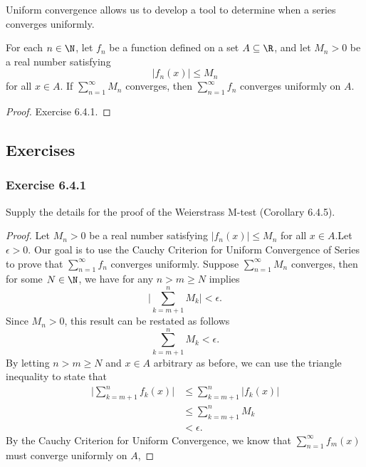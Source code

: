 Uniform convergence allows us to develop a tool to determine when a series converges uniformly.

\begin{tcolorbox}
    \begin{cor}
    For each \( n \in \N  \), let \( f_n  \) be a function defined on a set \( A \subseteq \R  \), and let \( M_n > 0  \) be a real number satisfying
    \[  | f_n(x)  | \leq M_n \] for all \( x \in A  \). If \( \sum_{ n=1 }^{ \infty  } M_n  \) converges, then \( \sum_{ n=1 }^{ \infty  } f_n  \) converges uniformly on \( A  \).
    \end{cor}
\end{tcolorbox}

\begin{proof}
Exercise 6.4.1.
\end{proof}

\subsection{Exercises}

\subsubsection{Exercise 6.4.1} Supply the details for the proof of the Weierstrass M-test (Corollary 6.4.5).

\begin{proof}
Let \( M_n > 0  \) be a real number satisfying \( | f_n(x)  | \leq M_n  \) for all \( x \in A  \).Let \( \epsilon > 0 \). Our goal is to use the Cauchy Criterion for Uniform Convergence of Series to prove that \( \sum_{ n=1 }^{ \infty  } f_n  \) converges uniformly. Suppose \( \sum_{ n=1 }^{ \infty  } M_n  \) converges, then for some \( N \in \N  \), we have for any \( n > m \geq N  \) implies 
\[ \Big| \sum_{ k=m+1 }^{ n } M_k \Big| < \epsilon.   \]
Since \( M_n > 0  \), this result can be restated as follows
\[  \sum_{ k=m+1 }^{ n } M_k < \epsilon. \]
By letting \( n > m \geq N  \) and \( x \in A  \) arbitrary as before, we can use the triangle inequality to state that 
\begin{align*}
    \Big| \sum_{ k=m+1 }^{ n } f_k(x)  \Big| &\leq \sum_{ k=m+1 }^{ n }| f_k(x)  |  \\
                                             &\leq  \sum_{ k=m+1 }^{ n } M_k \\
                                             &< \epsilon.
\end{align*}
By the Cauchy Criterion for Uniform Convergence, we know that \( \sum_{ n=1 }^{ \infty  } f_m(x)  \) must converge uniformly on \( A  \),
\end{proof}

